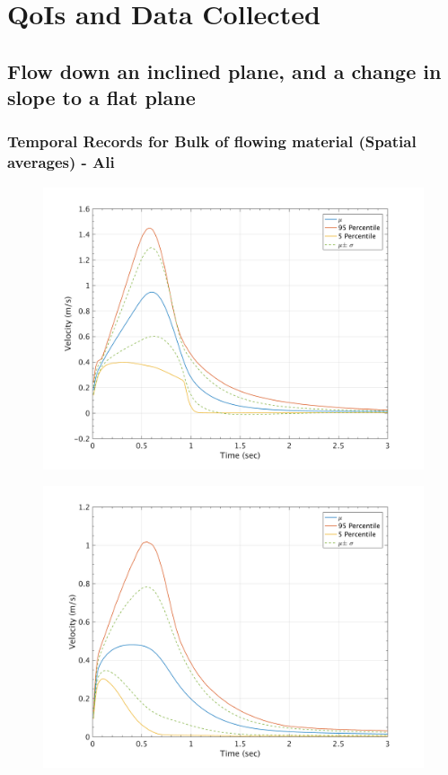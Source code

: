 \documentclass{article}
\begin{document}
\section{QoIs and Data Collected}
\subsection{Flow down an inclined plane, and a change in slope to a flat plane}


\subsubsection{Temporal Records for Bulk of flowing material (Spatial averages) - Ali}

\begin{figure}[H]
        \begin{minipage}[b]{0.5\linewidth}
                \centering
                \includegraphics[width=1\textwidth]{InclinedPlane/GlobalRecords/C_Global_Vel.png}
                \label{fig:Ramp-SP-Vel-C}
        \end{minipage}
        \begin{minipage}[b]{0.5\linewidth}
                \centering
                \includegraphics[width=1\textwidth]{InclinedPlane/GlobalRecords/P_Global_Vel.png}

\end{minipage}
\end{figure}
\end{document}
